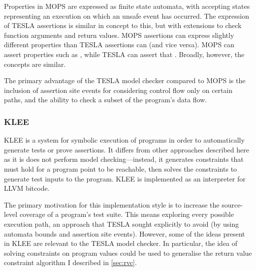 Properties in MOPS are expressed as finite state automata, with accepting states
representing an execution on which an unsafe event has occurred. The expression
of TESLA assertions is similar in concept to this, but with extensions to check
function arguments and return values. MOPS assertions can express slightly
different properties than TESLA assertions can (and vice versa). MOPS can assert
properties such as , while TESLA can assert that
. Broadly, however, the concepts are similar.

The primary advantage of the TESLA model checker compared to MOPS is the
inclusion of assertion site events for considering control flow only on certain
paths, and the ability to check a subset of the program's data flow.

\subsubsection{KLEE}

KLEE \cite{cadar_klee:_2008} is a system for symbolic execution of programs in
order to automatically generate tests or prove assertions. It differs from other
approaches described here as it is does not perform model checking---instead, it
generates constraints that must hold for a program point to be reachable, then
solves the constraints to generate test inputs to the program. KLEE is
implemented as an interpreter for LLVM bitcode.

The primary motivation for this implementation style is to increase the
source-level coverage of a program's test suite. This means exploring every
possible execution path, an approach that TESLA sought explicitly to avoid (by
using automata bounds and assertion site events). However, some of the ideas
present in KLEE are relevant to the TESLA model checker. In particular, the idea
of solving constraints on program values could be used to generalise the return
value constraint algorithm I described in \autoref{sec:rvc}.
